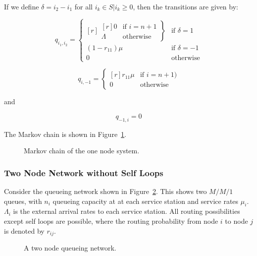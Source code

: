 \documentclass{article}
\begin{document}
If we define $\delta = i_2 - i_1$ for all $i_k \in S | i_k \geq 0$, then the transitions are given by:

\begin{equation}
  q_{i_1, i_2} = \left\{
  \begin{matrix*}[ r ]
    \left. \begin{matrix*}[ r ]
      0 & \text{if } i = n + 1 \\
      \Lambda & \text{otherwise}
    \end{matrix*} \right\} & \text{if } \delta = 1 \\
    (1 - r_{11})\mu & \text{if } \delta = -1 \\
    0 & \text{otherwise}
  \end{matrix*} \right.
\end{equation}

\begin{equation}
  q_{i, -1} = \left\{
  \begin{matrix*}[ r ]
    r_{11}\mu & \text{if } i = n + 1) \\
    0 & \text{otherwise}
  \end{matrix*}
  \right.
\end{equation}

and

\begin{equation}
  q_{-1, i} = 0
\end{equation}

The Markov chain is shown in Figure~\ref{fig:1nodeMC}.

\begin{figure}[H]
    
    \caption{Markov chain of the one node system.}
    \label{fig:1nodeMC}
\end{figure}

\subsubsection{Two Node Network without Self Loops}
Consider the queueing network shown in Figure~\ref{fig:queueingnetwork_2nodes}.
This shows two \(M/M/1\) queues, with \(n_i\) queueing capacity at at each service station and service rates $\mu_i$.
$\Lambda_i$ is the external arrival rates to each service station.
All routing possibilities except self loops are possible, where the routing probability from node $i$ to node $j$ is denoted by $r_{ij}$.

\begin{figure}[H]
  
  \caption{A two node queueing network.}
  \label{fig:queueingnetwork_2nodes}
\end{figure}
\end{document}
